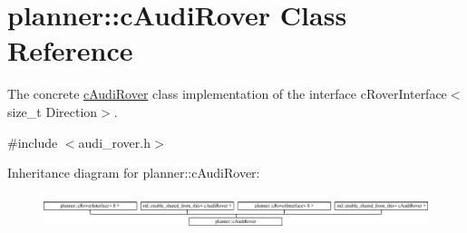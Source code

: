 \hypertarget{classplanner_1_1c_audi_rover}{}\section{planner\+:\+:c\+Audi\+Rover Class Reference}
\label{classplanner_1_1c_audi_rover}


The concrete \mbox{\hyperlink{classplanner_1_1c_audi_rover}{c\+Audi\+Rover}} class implementation of the interface c\+Rover\+Interface$<$size\+\_\+t Direction$>$.  




{\ttfamily \#include $<$audi\+\_\+rover.\+h$>$}

Inheritance diagram for planner\+:\+:c\+Audi\+Rover\+:\begin{figure}[H]
\begin{center}
\leavevmode
\includegraphics[height=1.018182cm]{classplanner_1_1c_audi_rover}
\end{center}
\end{figure}
